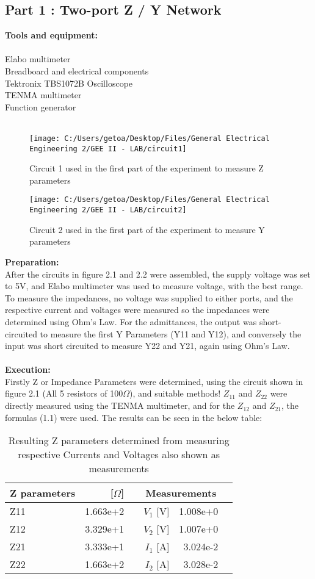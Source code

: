 \documentclass[12pt]{report}
\begin{document}
\subsection {Part 1 : Two-port Z / Y Network } 
\textbf{Tools and equipment:} \\
\\Elabo multimeter \\ Breadboard and electrical components
\\Tektronix TBS1072B Oscilloscope \\
TENMA multimeter\\  Function generator  \\ 
\\
\begin{figure}[ht]
  \centering
  \texttt{[image: C:/Users/getoa/Desktop/Files/General Electrical Engineering 2/GEE II - LAB/circuit1]}
  \caption{Circuit 1 used in the first part of the experiment to measure Z parameters}
\end{figure} 
\begin{figure}[ht!]
  \centering
  \texttt{[image: C:/Users/getoa/Desktop/Files/General Electrical Engineering 2/GEE II - LAB/circuit2]}
  \caption{Circuit 2 used in the first part of the experiment to measure Y parameters}
\end{figure} 
\textbf{Preparation:} \\
After the circuits in figure 2.1 and 2.2 were assembled, the supply voltage was set to 5V, and Elabo multimeter was used to measure voltage, with the best range. To measure the impedances, no voltage was supplied to either ports, and the respective current and voltages were measured so the impedances were determined using Ohm's Law. For the admittances, the output was short-circuited to measure the first Y Parameters (Y11 and Y12), and conversely the input was short circuited to measure Y22 and Y21, again using Ohm's Law.\\
\\
\textbf{Execution:}\\
Firstly Z or Impedance Parameters were determined, using the circuit shown in figure 2.1 (All 5 resistors of 100$ \Omega$), and suitable methods! $Z_{11}$ and $Z_{22}$ were directly measured using the TENMA multimeter, and for the $ Z_{12}$ and $Z_{21}	$, the formulas (1.1) were used. The results can be seen in the below table:
\begin{table}[!htp]\centering
\large
\begin{tabular}{lrrrrr}\toprule
Z parameters & [$\Omega$] & &\multicolumn{2}{c}{Measurements } \\\midrule
Z11 &1.663e+2 & &$V_1$ [V] & 1.008e+0\\
Z12 &3.329e+1 & &$V_2$ [V] &1.007e+0 \\
Z21 &3.333e+1 & & $I_1$ [A] &3.024e-2 \\
Z22 &1.663e+2 & & $I_2$ [A] &3.028e-2 \\
\bottomrule
\end{tabular}
\caption{Resulting Z parameters determined from measuring respective Currents and Voltages also shown as measurements}
\label{tab: }
\end{table}
\end{document}
